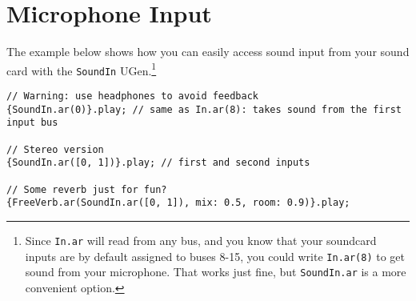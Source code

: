 \section{Microphone Input}

The example below shows how you can easily access sound input from your sound card with the \texttt{SoundIn} UGen.\footnote{Since \texttt{In.ar} will read from any bus, and you know that your soundcard inputs are by default assigned to buses 8-15, you could write \texttt{In.ar(8)} to get sound from your microphone. That works just fine, but \texttt{SoundIn.ar} is a more convenient option.}

\begin{lstlisting}[style=SuperCollider-IDE, basicstyle=\scttfamily\footnotesize]
// Warning: use headphones to avoid feedback
{SoundIn.ar(0)}.play; // same as In.ar(8): takes sound from the first input bus

// Stereo version
{SoundIn.ar([0, 1])}.play; // first and second inputs

// Some reverb just for fun?
{FreeVerb.ar(SoundIn.ar([0, 1]), mix: 0.5, room: 0.9)}.play;
\end{lstlisting}